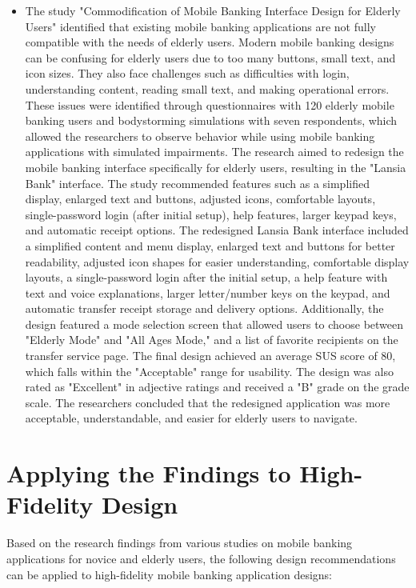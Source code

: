 \documentclass[a4paper,12pt]{report}
\begin{document}
\begin{itemize}
  \item The study "Commodification of Mobile Banking Interface Design for Elderly Users" identified that existing mobile banking applications are not fully compatible with the needs of elderly users. Modern mobile banking designs can be confusing for elderly users due to too many buttons, small text, and icon sizes. They also face challenges such as difficulties with login, understanding content, reading small text, and making operational errors. These issues were identified through questionnaires with 120 elderly mobile banking users and bodystorming simulations with seven respondents, which allowed the researchers to observe behavior while using mobile banking applications with simulated impairments. The research aimed to redesign the mobile banking interface specifically for elderly users, resulting in the "Lansia Bank" interface. The study recommended features such as a simplified display, enlarged text and buttons, adjusted icons, comfortable layouts, single-password login (after initial setup), help features, larger keypad keys, and automatic receipt options. The redesigned Lansia Bank interface included a simplified content and menu display, enlarged text and buttons for better readability, adjusted icon shapes for easier understanding, comfortable display layouts, a single-password login after the initial setup, a help feature with text and voice explanations, larger letter/number keys on the keypad, and automatic transfer receipt storage and delivery options. Additionally, the design featured a mode selection screen that allowed users to choose between "Elderly Mode" and "All Ages Mode," and a list of favorite recipients on the transfer service page. The final design achieved an average SUS score of 80, which falls within the "Acceptable" range for usability. The design was also rated as "Excellent" in adjective ratings and received a "B" grade on the grade scale. The researchers concluded that the redesigned application was more acceptable, understandable, and easier for elderly users to navigate.
\end{itemize}

\section{Applying the Findings to High-Fidelity Design}

Based on the research findings from various studies on mobile banking applications for novice and elderly users, the following design recommendations can be applied to high-fidelity mobile banking application designs:
\end{document}
